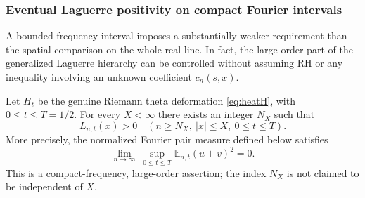 \subsubsection{Eventual Laguerre positivity on compact Fourier intervals}
\label{subsec:theta-high-order-compact}

A bounded-frequency interval imposes a substantially
weaker requirement than the spatial comparison on the
whole real line. In fact, the large-order part of the
generalized Laguerre hierarchy can be controlled without
assuming RH or any inequality involving an unknown
coefficient $c_n(s,x)$.

\begin{theorem}
\label{thm:compact-eventual-laguerre}
Let $H_t$ be the genuine Riemann theta deformation
\eqref{eq:heatH}, with $0\le t\le T=1/2$. For every
$X<\infty$ there exists an integer $N_X$ such that
\begin{equation}
\boxed{L_{n,t}(x)>0
\quad(n\ge N_X,\ |x|\le X,\ 0\le t\le T).}
\label{eq:compact-eventual}
\end{equation}
More precisely, the normalized Fourier pair measure
defined below satisfies
\begin{equation}
\boxed{\lim_{n\to\infty}\ \sup_{0\le t\le T}
\mathbb E_{n,t}(u+v)^2=0.}
\label{eq:conditional-squeeze}
\end{equation}
This is a compact-frequency, large-order assertion;
the index $N_X$ is not claimed to be independent of $X$.
\end{theorem}

